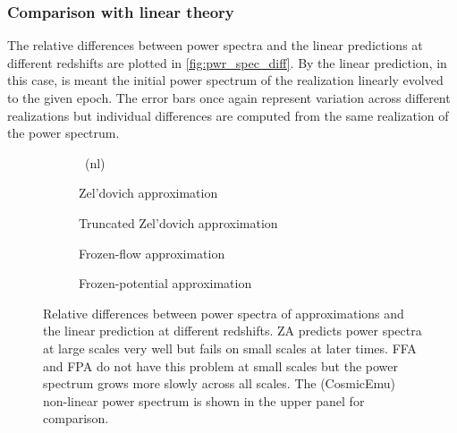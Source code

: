 \subsubsection{Comparison with linear theory}
The relative differences between power spectra and the linear predictions at different redshifts are plotted in \autoref{fig:pwr_spec_diff}. By the linear prediction, in this case, is meant the initial power spectrum of the realization linearly evolved to the given epoch. The error bars once again represent variation across different realizations but individual differences are computed from the same realization of the power spectrum.
\begin{figure*}[!hbt]
\centering
	\begin{subfigure}{1.0\textwidth}
	\end{subfigure}
	\begin{subfigure}{0.5\textwidth}
		\caption{\LCDM\ (nl)}	
	\end{subfigure}
	\begin{subfigure}{0.5\textwidth}
		\caption{Zel'dovich approximation}
	\end{subfigure}%
	\begin{subfigure}{0.5\textwidth}
		\caption{Truncated Zel'dovich approximation}
	\end{subfigure}
	\begin{subfigure}{0.5\textwidth}
		\caption{Frozen-flow approximation}
	\end{subfigure}%
	\begin{subfigure}{0.5\textwidth}
		\caption{Frozen-potential approximation}
	\end{subfigure}
	\caption{Relative differences between power spectra of approximations and the linear prediction at different redshifts. ZA predicts power spectra at large scales very well but fails on small scales at later times. FFA and FPA do not have this problem at small scales but the power spectrum grows more slowly across all scales. The (CosmicEmu) non-linear power spectrum is shown in the upper panel for comparison.}
	\label{fig:pwr_spec_diff}
\end{figure*}

